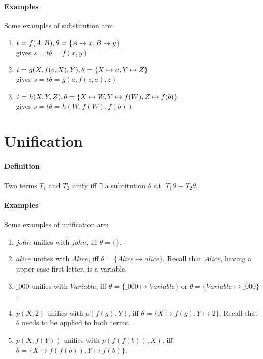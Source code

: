 \documentclass{article}
\begin{document}
\begin{multicols}{2}
  \paragraph{Examples} Some examples of substitution are:
  
  \begin{enumerate}
  \item $t = f(A,B),\\ \theta = \{A \mapsto x, B \mapsto y\}$\\ gives $s=t\theta=f(x, y)$
  \item $t = g(X, f(c, X), Y),\\ \theta = \{X \mapsto a, Y \mapsto Z\}$\\ gives $s=t\theta=g(a, f(c, a), z)$
  \item $t = h(X, Y, Z),\\ \theta = \{X \mapsto W, Y \mapsto f(W), Z \mapsto f(b)\}$\\ gives $s=t\theta=h(W, f(W), f(b))$
  \end{enumerate}
  
  \section{Unification}
  
  \paragraph{Definition} Two terms $T_1$ and $T_2$ unify iff $\exists$ a subtitution $\theta$ s.t. $T_1\theta \equiv T_2\theta$.
  
  \paragraph{Examples} Some examples of unification are:
  
  \begin{enumerate}
  \item $john$ unifies with $john$, iff $\theta = \{\}$.
  \item $alice$ unifies with $Alice$, iff $\theta = \{Alice \mapsto alice\}$. Recall that $Alice$, having a upper-case first letter, is a variable.
  \item $\_000$ unifies with $Variable$, iff $\theta = \{\_000 \mapsto Variable\}$ or $\theta = \{Variable \mapsto \_000\}$.
  \item $p(X, 2)$ unifies with $p(f(g), Y)$, iff $\theta = \{X \mapsto f(g), Y \mapsto 2\}$. Recall that $\theta$ needs to be applied to both terms.
  \item $p(X, f(Y))$ unifies with $p(f(f(b)), X)$, iff $\theta = \{X \mapsto f(f(b)), Y \mapsto f(b)\}$.
  \end{enumerate}
  

\end{multicols}
\end{document}
